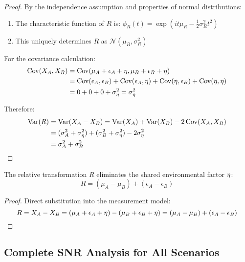 \begin{proof}
By the independence assumption and properties of normal distributions:
\begin{enumerate}
\item The characteristic function of $R$ is: $\phi_R(t) = \exp(it\mu_R - \frac{1}{2}\sigma_R^2 t^2)$
\item This uniquely determines $R$ as $\mathcal{N}(\mu_R, \sigma_R^2)$
\end{enumerate}

For the covariance calculation:
\begin{align}
\operatorname{Cov}(X_A, X_B) &= \operatorname{Cov}(\mu_A + \epsilon_A + \eta, \mu_B + \epsilon_B + \eta) \nonumber\\
&= \operatorname{Cov}(\epsilon_A, \epsilon_B) + \operatorname{Cov}(\epsilon_A, \eta) + \operatorname{Cov}(\eta, \epsilon_B) + \operatorname{Cov}(\eta, \eta) \nonumber\\
&= 0 + 0 + 0 + \sigma_\eta^2 = \sigma_\eta^2
\end{align}

Therefore:
\begin{align}
\operatorname{Var}(R) &= \operatorname{Var}(X_A - X_B) = \operatorname{Var}(X_A) + \operatorname{Var}(X_B) - 2\operatorname{Cov}(X_A, X_B) \nonumber\\
&= (\sigma_A^2 + \sigma_\eta^2) + (\sigma_B^2 + \sigma_\eta^2) - 2\sigma_\eta^2 \nonumber\\
&= \sigma_A^2 + \sigma_B^2
\end{align}
\end{proof}

\begin{corollary}
\label{cor:env_cancellation}
The relative transformation $R$ eliminates the shared environmental factor $\eta$:
\begin{equation}
R = (\mu_A - \mu_B) + (\epsilon_A - \epsilon_B)
\end{equation}
\end{corollary}

\begin{proof}
Direct substitution into the measurement model:
\begin{equation}
R = X_A - X_B = (\mu_A + \epsilon_A + \eta) - (\mu_B + \epsilon_B + \eta) = (\mu_A - \mu_B) + (\epsilon_A - \epsilon_B)
\end{equation}
\end{proof}

\subsection{Complete SNR Analysis for All Scenarios}

